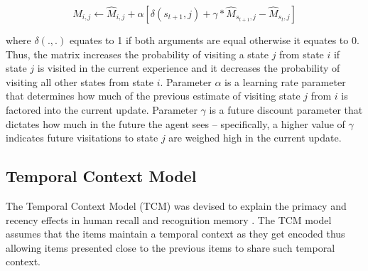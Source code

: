\begin{equation}
	M_{i,j} \leftarrow \hat{M}_{i,j} + \alpha[\delta(s_{t+1},j) + \gamma*\hat{M}_{s_{t+1},j} - \hat{M}_{s_t,j}]
\end{equation}

where $\delta(., .)$ equates to 1 if both arguments are equal otherwise it equates to 0. Thus, the matrix increases the probability of visiting a state $j$ from state $i$ if state $j$ is visited in the current experience and it decreases the probability of visiting all other states from state $i$. Parameter $\alpha$ is a learning rate parameter that determines how much of the previous estimate of visiting state $j$ from $i$ is factored into the current update. Parameter $\gamma$ is a future discount parameter that dictates how much in the future the agent sees -- specifically, a higher value of $\gamma$ indicates future visitations to state $j$ are weighed high in the current update.

\subsection{Temporal Context Model}
The Temporal Context Model (TCM) was devised to explain the primacy and recency effects in human recall and recognition memory \cite{howard2005temporal}. The TCM model assumes that the items maintain a temporal context as they get encoded thus allowing items presented close to the previous items to share such temporal context. 




